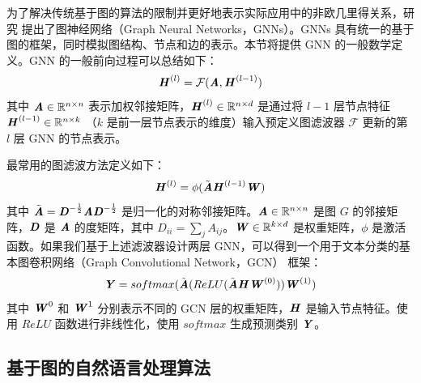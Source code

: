 为了解决传统基于图的算法的限制并更好地表示实际应用中的非欧几里得关系，研究\cite{GNN} 提出了图神经网络（Graph Neural Networks，GNNs）。GNNs 具有统一的基于图的框架，同时模拟图结构、节点和边的表示。本节将提供 GNN 的一般数学定义。GNN 的一般前向过程可以总结如下：
\begin{equation}
  \textbf{\textit{H}}^{(l)} =  \mathcal{F}(\textbf{\textit{A}},\textbf{\textit{H}}^{(l-1)})
\end{equation}
\vspace{1pt}
其中 $\textbf{\textit{A}}\in \mathbb{R}^{n\times n}$ 表示加权邻接矩阵，$\textbf{\textit{H}}^{(l)}\in \mathbb{R}^{n\times d}$ 是通过将 $l-1$ 层节点特征 $\textbf{\textit{H}}^{(l-1)}\in \mathbb{R}^{n\times k}$ （$k$ 是前一层节点表示的维度）输入预定义图滤波器 $\mathcal{F}$ 更新的第 $l$ 层 GNN 的节点表示。

最常用的图滤波方法定义如下：
\begin{equation}
  \textbf{\textit{H}}^{(l)} =  \phi(\tilde{\textbf{\textit{A}}}\textbf{\textit{H}}^{(l-1)}\textbf{\textit{W}})
\end{equation}
其中 $\tilde{\textbf{\textit{A}}}=\textbf{\textit{D}}^{-\frac{1}{2}}\textbf{\textit{AD}}^{-\frac{1}{2}}$ 是归一化的对称邻接矩阵。$\textbf{\textit{A}}\in \mathbb{R}^{n\times n}$ 是图 $G$ 的邻接矩阵，$\textbf{\textit{D}}$ 是 $\textbf{\textit{A}}$ 的度矩阵，其中 $D_{ii}=\sum_{j}A_{ij}$。$\textbf{\textit{W}}\in \mathbb{R}^{k\times d}$ 是权重矩阵，$\phi$ 是激活函数。如果我们基于上述滤波器设计两层 GNN，可以得到一个用于文本分类的基本图卷积网络（Graph Convolutional Network，GCN）\cite{GCN} 框架：
\begin{equation}
  \textbf{\textit{Y}} =  softmax(\tilde{\textbf{\textit{A}}}(ReLU(\tilde{\textbf{\textit{A}}}\textbf{\textit{H}}\textbf{\textit{W}}^{(0)}))\textbf{\textit{W}}^{(1)})
\end{equation}
\vspace{1pt}
其中 $\textbf{\textit{W}}^0$ 和 $\textbf{\textit{W}}^1$ 分别表示不同的 GCN 层的权重矩阵，$\textbf{\textit{H}}$ 是输入节点特征。使用 $ReLU$ 函数进行非线性化，使用 $softmax$ 生成预测类别 $\textbf{\textit{Y}}$。


\subsection{基于图的自然语言处理算法}

